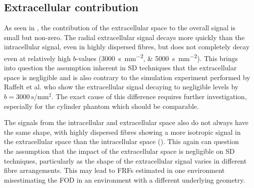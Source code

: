 \subsection{Extracellular contribution }
\label{sec:frf_discussion_extra_contribution}
As seen in , the contribution of the extracellular space to the overall signal is small but non-zero.
The radial extracellular signal decays more quickly than the intracellular signal, even in highly dispersed fibres, but does not completely decay even at relatively high $b$-values (\SIlist{3000; 5000}{\second\per\milli\metre\squared}).
This brings into question the assumption inherent in \ac{SD} techniques that the extracellular space is negligible and is also contrary to the simulation experiment performed by Raffelt et al. \cite{Raffelt2012} who show the extracellular signal decaying to negligible levels by $b=\SI{3000}{\second\per\milli\metre\squared}$. The exact cause of this difference requires further investigation, especially for the cylinder phantom which should be comparable.

The signals from the intracellular and extracellular space also do not always have the same shape, with highly dispersed fibres showing a more isotropic signal in the extracellular space than the intracellular space ().
This again can question the assumption that the impact of the extracellular space is negligible on \ac{SD} techniques, particularly as the shape of the extracellular signal varies in different fibre arrangements. This may lead to \ac{FRF}s estimated in one environment misestimating the \ac{FOD} in an environment with a different underlying geometry.

